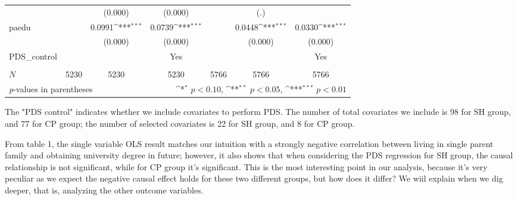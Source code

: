 \documentclass[]{AEA}
\def\sym#1{\ifmmode^{#1}\else\(^{#1}\)\fi}
\begin{document}
\begin{center}
\begin{table}
\begin{tabular}{l*{6}c}
                &                     &     (0.000)         &     (0.000)         &                     &         (.)         &                     \\
    [1em]
    paedu       &                     &      0.0991\sym{***}&      0.0739\sym{***}&                     &      0.0448\sym{***}&      0.0330\sym{***}\\
                &                     &     (0.000)         &     (0.000)         &                     &     (0.000)         &     (0.000)         \\
    [1em]
    PDS\_control  &   &  &  Yes    &  &    &  Yes \\
    &   &      &      &   &      &      \\
    \hline
    \(N\)       &        5230         &        5230         &        5230         &        5766         &        5766         &        5766         \\
    \bottomrule
    \multicolumn{3}{l}{\footnotesize \textit{p}-values in parentheses} & \multicolumn{4}{r}{\footnotesize \sym{*} \(p<0.10\), \sym{**} \(p<0.05\), \sym{***} \(p<0.01\)}\\
    \end{tabular}
    \begin{tablenotes}
        The "PDS control" indicates whether we include covariates to perform PDS.  The number of total covariates we include is 98 for SH group, and 77 for CP group; the number of selected covariates is 22 for SH group, and 8 for CP group.
    \end{tablenotes}
    \end{table}
    \end{center}

    From table 1, the single variable OLS result matches our intuition with a strongly negative correlation between living in single parent family and obtaining university degree in future; however, it also shows that when considering the PDS regression for SH group, the causal relationship is not significant, while for CP group it's significant.  This is the most interesting point in our analysis, because it's very peculiar as we expect the negative causal effect holds for these two different groups, but how does it differ?  We wiil explain when we dig deeper, that is, analyzing the other outcome variables.
\end{document}
